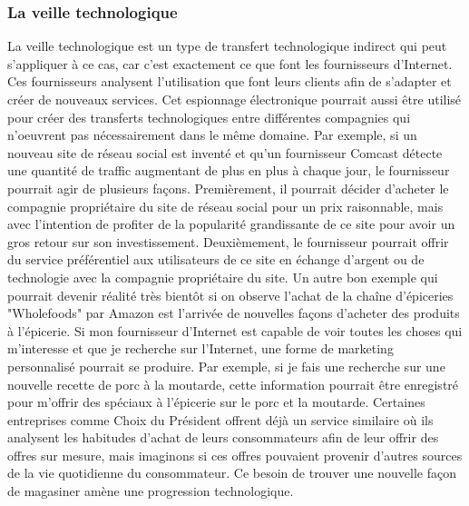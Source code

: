 \documentclass[12pt]{article}
\begin{document}
\subsubsection{La veille technologique}
La veille technologique est un type de transfert technologique indirect qui peut s'appliquer à ce cas, car c'est exactement ce que font les fournisseurs d'Internet. Ces fournisseurs analysent l'utilisation que font leurs clients afin de s'adapter et créer de nouveaux services. Cet espionnage électronique pourrait aussi être utilisé pour créer des transferts technologiques entre différentes compagnies qui n'oeuvrent pas nécessairement dans le même domaine. Par exemple, si un nouveau site de réseau social est inventé et qu'un fournisseur Comcast détecte une quantité de traffic augmentant de plus en plus à chaque jour, le fournisseur pourrait agir de plusieurs façons. Premièrement, il pourrait décider d'acheter le compagnie propriétaire du site de réseau social pour un prix raisonnable, mais avec l'intention de profiter de la popularité grandissante de ce site pour avoir un gros retour sur son investissement. Deuxièmement, le fournisseur pourrait offrir du service préférentiel aux utilisateurs de ce site en échange d'argent ou de technologie avec la compagnie propriétaire du site. Un autre bon exemple qui pourrait devenir réalité très bientôt si on observe l'achat de la chaîne d'épiceries "Wholefoods" par Amazon est l'arrivée de nouvelles façons d'acheter des produits à l'épicerie. Si mon fournisseur d'Internet est capable de voir toutes les choses qui m'interesse et que je recherche sur l'Internet, une forme de marketing personnalisé pourrait se produire. Par exemple, si je fais une recherche sur une nouvelle recette de porc à la moutarde, cette information pourrait être enregistré pour m'offrir des spéciaux à l'épicerie sur le porc et la moutarde. Certaines entreprises comme Choix du Président offrent déjà un service similaire où ils analysent les habitudes d'achat de leurs consommateurs afin de leur offrir des offres sur mesure, mais imaginons si ces offres pouvaient provenir d'autres sources de la vie quotidienne du consommateur. Ce besoin de trouver une nouvelle façon de magasiner amène une progression technologique. 
\end{document}
